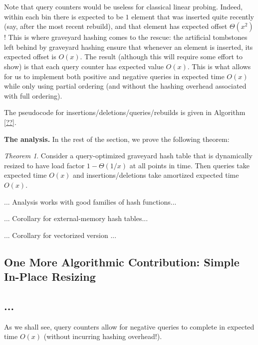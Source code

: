 \documentclass[10pt]{article}
\theoremstyle{remark}
\newtheorem{theorem}{Theorem}[section]
\theoremstyle{remark}
\renewcommand{\paragraph}[1]{\vspace{.2 cm} \noindent \textbf{#1}}
\begin{document}
Note that query counters would be useless for classical linear probing. Indeed, within each bin there is expected to be $1$ element that was inserted quite recently (say, after the most recent rebuild), and that element has expected offset $\Theta(x^2)$! This is where graveyard hashing comes to the rescue: the artificial tombstones left behind by graveyard hashing ensure that whenever an element is inserted, its expected offset is $O(x)$. The result (although this will require some effort to show) is that each query counter has expected value $O(x)$. This is what allows for us to implement both positive and negative queries in expected time $O(x)$ while only using partial ordering (and without the hashing overhead associated with full ordering).

The pseudocode for insertions/deletions/queries/rebuilds is given in Algorithm \ref{??}.

\paragraph{The analysis.}
In the rest of the section, we prove the following theorem:
\begin{theorem}
Consider a query-optimized graveyard hash table that is dynamically resized to have load factor $1 - \Theta(1/x)$ at all points in time. Then queries take expected time $O(x)$ and insertions/deletions take amortized expected time $O(x)$. 
\end{theorem}

... Analysis works with good families of hash functions...

... Corollary for external-memory hash tables...

... Corollary for vectorized version ...


\subsection{One More Algorithmic Contribution: Simple In-Place Resizing}



\subsection{...}





As we shall see, query counters allow for negative queries to complete in expected time $O(x)$ (without incurring hashing overhead!). 
\end{document}
